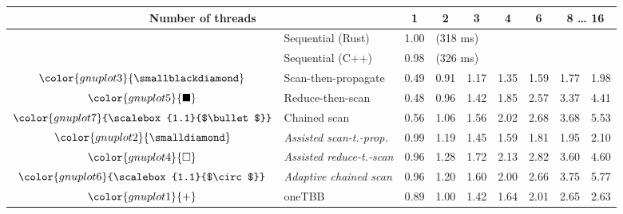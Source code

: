 \begin{tabular}{clrrrrrrr}
\toprule
\multicolumn{2}{c}{\textbf{Number of threads}} & \multicolumn{1}{c}{\textbf{ 1 }} & \multicolumn{1}{c}{\textbf{ 2 }} & \multicolumn{1}{c}{\textbf{ 3 }} & \multicolumn{1}{c}{\textbf{ 4 }} & \multicolumn{1}{c}{\textbf{ 6 }} & \multicolumn{2}{c}{\textbf{ 8 } \dots \textbf{ 16 }} \\
\midrule
& Sequential (Rust) & \multicolumn{1}{r}{ 1.00 } & \multicolumn{ 6 }{l}{(318 ms)} \\
& Sequential (C++) & \multicolumn{1}{r}{ 0.98 } & \multicolumn{ 6 }{l}{(326 ms)} \\
\rowcolor{gnuplot3!10}$\color{gnuplot3}{\smallblackdiamond}$ & Scan-then-propagate & \cellcolor{gnuplot3!10} 0.49 & \cellcolor{gnuplot3!10} 0.91 & \cellcolor{gnuplot3!10} 1.17 & \cellcolor{gnuplot3!10} 1.35 & \cellcolor{gnuplot3!10} 1.59 & \cellcolor{gnuplot3!10} 1.77 & \cellcolor{gnuplot3!10} 1.98 \\
\rowcolor{gnuplot5!10}$\color{gnuplot5}{\blacksquare}$ & Reduce-then-scan & \cellcolor{gnuplot5!10} 0.48 & \cellcolor{gnuplot5!10} 0.96 & \cellcolor{gnuplot5!10} 1.42 & \cellcolor{gnuplot5!10} 1.85 & \cellcolor{gnuplot5!10} 2.57 & \cellcolor{gnuplot5!10} 3.37 & \cellcolor{gnuplot5!10} 4.41 \\
\rowcolor{gnuplot7!10}$\color{gnuplot7}{\scalebox{1.1}{$\bullet$}}$ & Chained scan & \cellcolor{gnuplot7!10} 0.56 & \cellcolor{gnuplot7!10} 1.06 & \cellcolor{gnuplot7!10} 1.56 & \cellcolor{gnuplot7!10} 2.02 & \cellcolor{gnuplot7!10} 2.68 & \cellcolor{gnuplot7!10} 3.68 & \cellcolor{gnuplot7!10} 5.53 \\
\rowcolor{gnuplot2!30}$\color{gnuplot2}{\smalldiamond}$ & \textit{Assisted scan-t.-prop.} & \cellcolor{gnuplot2!30} 0.99 & \cellcolor{gnuplot2!30} 1.19 & \cellcolor{gnuplot2!30} 1.45 & \cellcolor{gnuplot2!30} 1.59 & \cellcolor{gnuplot2!30} 1.81 & \cellcolor{gnuplot2!30} 1.95 & \cellcolor{gnuplot2!30} 2.10 \\
\rowcolor{gnuplot4!30}$\color{gnuplot4}{\square}$ & \textit{Assisted reduce-t.-scan} & \cellcolor{gnuplot4!30} 0.96 & \cellcolor{gnuplot4!30} 1.28 & \cellcolor{gnuplot4!30} 1.72 & \cellcolor{gnuplot4!30} 2.13 & \cellcolor{gnuplot4!30} 2.82 & \cellcolor{gnuplot4!30} 3.60 & \cellcolor{gnuplot4!30} 4.60 \\
\rowcolor{gnuplot6!30}$\color{gnuplot6}{\scalebox{1.1}{$\circ$}}$ & \textit{Adaptive chained scan} & \cellcolor{gnuplot6!30} 0.96 & \cellcolor{gnuplot6!30} 1.20 & \cellcolor{gnuplot6!30} 1.60 & \cellcolor{gnuplot6!30} 2.00 & \cellcolor{gnuplot6!30} 2.66 & \cellcolor{gnuplot6!30} 3.75 & \cellcolor{gnuplot6!30} 5.77 \\
\rowcolor{gnuplot1!10}$\color{gnuplot1}{+}$ & oneTBB & \cellcolor{gnuplot1!10} 0.89 & \cellcolor{gnuplot1!10} 1.00 & \cellcolor{gnuplot1!10} 1.42 & \cellcolor{gnuplot1!10} 1.64 & \cellcolor{gnuplot1!10} 2.01 & \cellcolor{gnuplot1!10} 2.65 & \cellcolor{gnuplot1!10} 2.63 \\
\bottomrule
\end{tabular}
